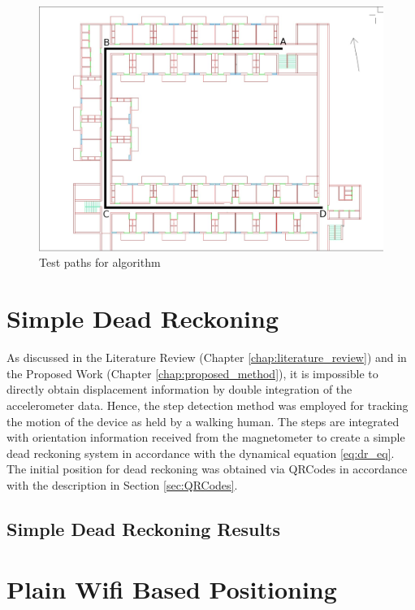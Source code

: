 \begin{figure}
    \centering
    \includegraphics[width=5in]{figures/test_paths.jpg}
    \caption{Test paths for algorithm\label{fig:test_paths}}
\end{figure}


\section{Simple Dead Reckoning}

As discussed in the Literature Review (Chapter \ref{chap:literature_review}) and
in the Proposed Work (Chapter \ref{chap:proposed_method}), it is impossible to
directly obtain displacement information by double integration of the
accelerometer data. Hence, the step detection method was employed for tracking
the motion of the device as held by a walking human. The steps are integrated
with orientation information received from the magnetometer to create a 
simple dead reckoning system in accordance with the dynamical equation 
\eqref{eq:dr_eq}. The initial position for dead reckoning was obtained via
QRCodes in accordance with the description in Section \ref{sec:QRCodes}.


\subsection{Simple Dead Reckoning Results}

\section{Plain Wifi Based Positioning}
